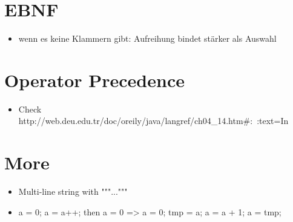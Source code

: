 \documentclass[UTF8]{ctexart}
\begin{document}
\section{EBNF}

\begin{itemize}
    \item wenn es keine Klammern gibt: Aufreihung bindet stärker als Auswahl
\end{itemize}

\section{Operator Precedence}

\begin{itemize}
    \item Check http://web.deu.edu.tr/doc/oreily/java/langref/ch04_14.htm#:~:text=In%
\end{itemize}

\section{More}

\begin{itemize}
    \item Multi-line string with """..."""
    \item a = 0; a = a++; then a = 0 => a = 0; tmp = a; a = a + 1; a = tmp;
\end{itemize}
\end{document}
